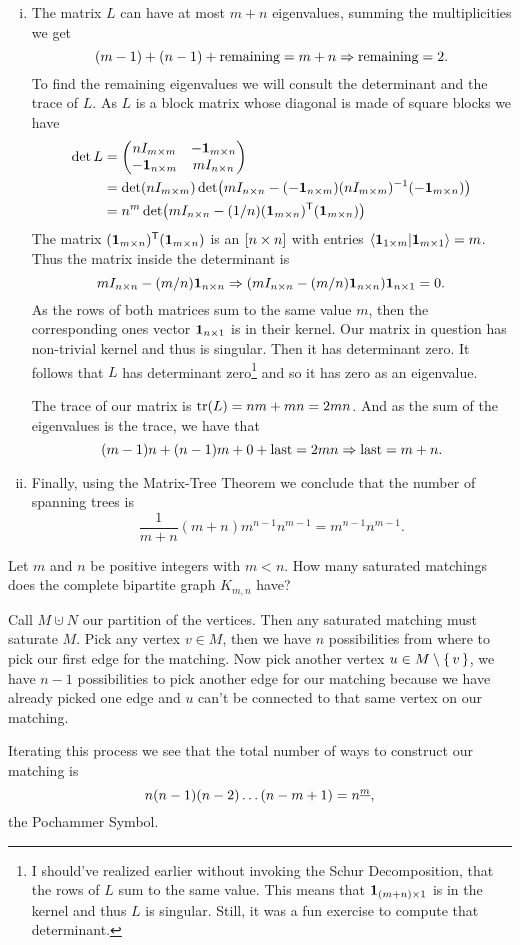 \documentclass[12pt]{memoir}
\begin{document}
\begin{ptcbr}
\begin{enumerate}[i)]
        \item The matrix $L$ can have at most $m+n$ eigenvalues, summing the multiplicities we get 
        $$(m-1)+(n-1)+\text{remaining}=m+n\Rightarrow \text{remaining}=2.$$
        To find the remaining eigenvalues we will consult the determinant and the trace of $L$. As $L$ is a block matrix whose diagonal is made of square blocks we have 
        \begin{align*}
            \det L&=\begin{pmatrix} nI_{m\times m} & -\mathbf{1}_{m\times n} \\ -\mathbf{1}_{n\times m} & mI_{n\times n} \end{pmatrix}\\
            &=\det(nI_{m\times m})\det(mI_{n\times n}-(-\mathbf{1}_{n\times m})(nI_{m\times m})^{-1}(-\mathbf{1}_{m\times n}))\\
            &=n^m\det(mI_{n\times n}-(1/n)(\mathbf{1}_{m\times n})^{\mathsf{T}}(\mathbf{1}_{m\times n}))
        \end{align*}
        The matrix $(\mathbf{1}_{m\times n})^{\mathsf{T}}(\mathbf{1}_{m\times n})$ is an $[n\times n]$ with entries $\braket{\mathbf{1}_{1\times m}}{\mathbf{1}_{m\times 1}}=m$. Thus the matrix inside the determinant is 
        $$mI_{n\times n}-(m/n)\mathbf{1}_{n\times n}\Rightarrow (mI_{n\times n}-(m/n)\mathbf{1}_{n\times n})\mathbf{1}_{n\times 1}=0.$$
        As the rows of both matrices sum to the same value $m$, then the corresponding ones vector $\mathbf{1}_{n\times 1}$ is in their kernel. Our matrix in question has non-trivial kernel and thus is singular. Then it has determinant zero. It follows that $L$ has determinant zero\footnote{I should've realized earlier without invoking the Schur Decomposition, that the rows of $L$ sum to the same value. This means that $\mathbf{1}_{(m+n)\times 1}$ is in the kernel and thus $L$ is singular. Still, it was a fun exercise to compute that determinant.} and so it has zero as an eigenvalue.\par 
        The trace of our matrix is $\tr(L)=nm+mn=2mn$. And as the sum of the eigenvalues is the trace, we have that 
        $$(m-1)n+(n-1)m+0+\text{last}=2mn\Rightarrow\text{last}=m+n.$$
        \item Finally, using the Matrix-Tree Theorem we conclude that the number of spanning trees is 
        $$\frac{1}{m+n}(m+n)m^{n-1}n^{m-1}=m^{n-1}n^{m-1}.$$
    \end{enumerate}
\end{ptcbr}

\begin{Ej}[Exercise 4]
    Let $m$ and $n$ be positive integers with $m < n$. How many saturated matchings does the complete bipartite graph $K_{m,n}$ have?
\end{Ej}

\begin{ptcbr}
Call $M\cupdot N$ our partition of the vertices. Then any saturated matching must saturate $M$. Pick any vertex $v\in M$, then we have $n$ possibilities from where to pick our first edge for the matching. Now pick another vertex $u\in M\setminus\{\,v\,\}$, we have $n-1$ possibilities to pick another edge for our matching because we have already picked one edge and $u$ can't be connected to that same vertex on our matching.\par
Iterating this process we see that the total number of ways to construct our matching is 
$$n(n-1)(n-2)\dots(n-m+1)=n^{\underline{m}},$$
the Pochammer Symbol.
\end{ptcbr}
\end{document}
